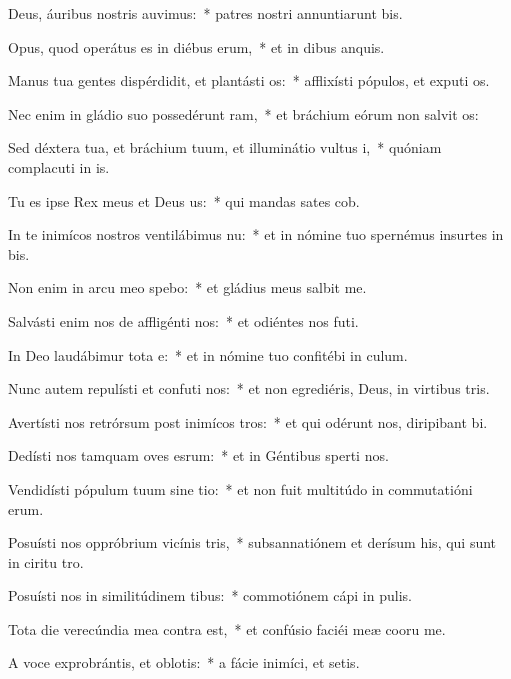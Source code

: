 \item Deus, áuribus nostris auvimus:~* patres nostri annuntiarunt bis.
\item Opus, quod operátus es in diébus erum,~* et in dibus anquis.
\item Manus tua gentes dispérdidit, et plantásti os:~* afflixísti pópulos, et exputi os.
\item Nec enim in gládio suo possedérunt ram,~* et bráchium eórum non salvit os:
\item Sed déxtera tua, et bráchium tuum, et illuminátio vultus i,~* quóniam complacuti in is.
\item Tu es ipse Rex meus et Deus us:~* qui mandas sates cob.
\item In te inimícos nostros ventilábimus nu:~* et in nómine tuo spernémus insurtes in bis.
\item Non enim in arcu meo spebo:~* et gládius meus  salbit me.
\item Salvásti enim nos de affligénti nos:~* et odiéntes nos futi.
\item In Deo laudábimur tota e:~* et in nómine tuo confitébi in culum.
\item Nunc autem repulísti et confuti nos:~* et non egrediéris, Deus, in virtibus tris.
\item Avertísti nos retrórsum post inimícos tros:~* et qui odérunt nos, diripibant bi.
\item Dedísti nos tamquam oves esrum:~* et in Géntibus sperti nos.
\item Vendidísti pópulum tuum sine tio:~* et non fuit multitúdo in commutatióni erum.
\item Posuísti nos oppróbrium vicínis tris,~* subsannatiónem et derísum his, qui sunt in ciritu tro.
\item Posuísti nos in similitúdinem tibus:~* commotiónem cápi in pulis.
\item Tota die verecúndia mea contra  est,~* et confúsio faciéi meæ cooru me.
\item A voce exprobrántis, et oblotis:~* a fácie inimíci, et setis.
